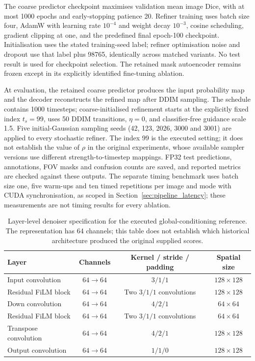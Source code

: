 \documentclass[jimaging,article,submit,pdftex,moreauthors]{Definitions/mdpi}%
\begin{document}
The coarse predictor checkpoint maximises validation mean image Dice, with at most 1000 epochs and early-stopping patience 20. Refiner training uses batch size four, AdamW with learning rate $10^{-4}$ and weight decay $10^{-3}$, cosine scheduling, gradient clipping at one, and the predefined final epoch-100 checkpoint. Initialisation uses the stated training-seed label; refiner optimisation noise and dropout use that label plus 98765, identically across matched variants. No test result is used for checkpoint selection. The retained mask autoencoder remains frozen except in its explicitly identified fine-tuning ablation.

At evaluation, the retained coarse predictor produces the input probability map and the decoder reconstructs the refined map after DDIM sampling. The schedule contains 1000 timesteps; coarse-initialised refinement starts at the explicitly fixed index $t_s=99$, uses 50 DDIM transitions, $\eta=0$, and classifier-free guidance scale 1.5. Five initial-Gaussian sampling seeds (42, 123, 2026, 3000 and 3001) are applied to every stochastic refiner. The index 99 is the executed setting; it does not establish the value of $\rho$ in the original experiments, whose available sampler versions use different strength-to-timestep mappings. FP32 test predictions, annotations, FOV masks and confusion counts are saved, and reported metrics are checked against these outputs. The separate timing benchmark uses batch size one, five warm-ups and ten timed repetitions per image and mode with CUDA synchronisation, as scoped in Section~\ref{sec:pipeline_latency}; these measurements are not timing results for every ablation.

\begin{table}[htbp]
\centering
\caption{Layer-level denoiser specification for the executed global-conditioning reference. The representation has 64 channels; this table does not establish which historical architecture produced the original supplied scores.}
\label{tab:new_denoiser_layers}
\small
\begin{tabular}{lccc}
\toprule
Layer & Channels & Kernel / stride / padding & Spatial size \\
\midrule
Input convolution & $64\rightarrow64$ & $3/1/1$ & $128\times128$ \\
Residual FiLM block & $64\rightarrow64$ & Two $3/1/1$ convolutions & $128\times128$ \\
Down convolution & $64\rightarrow64$ & $4/2/1$ & $64\times64$ \\
Residual FiLM block & $64\rightarrow64$ & Two $3/1/1$ convolutions & $64\times64$ \\
Transpose convolution & $64\rightarrow64$ & $4/2/1$ & $128\times128$ \\
Output convolution & $64\rightarrow64$ & $1/1/0$ & $128\times128$ \\
\bottomrule
\end{tabular}
\end{table}
\end{document}
